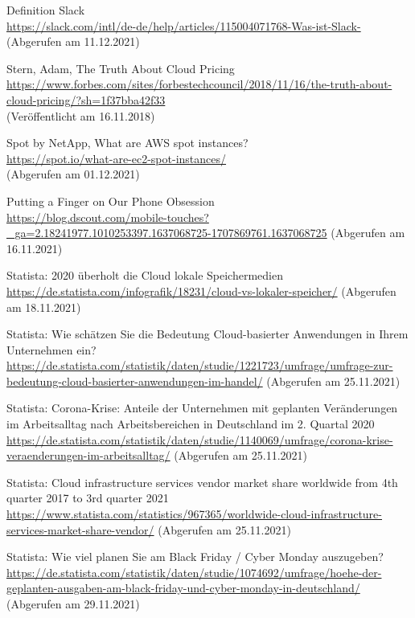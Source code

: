 \begin{thebibliography}{HR08}
  Definition Slack\\
 \url{https://slack.com/intl/de-de/help/articles/115004071768-Was-ist-Slack-}
 (Abgerufen am 11.12.2021)

  Stern, Adam, The Truth About Cloud Pricing \\
  \url{https://www.forbes.com/sites/forbestechcouncil/2018/11/16/the-truth-about-cloud-pricing/?sh=1f37bba42f33}\\
  (Veröffentlicht am 16.11.2018)

 Spot by NetApp, What are AWS spot instances?\\
  \url{https://spot.io/what-are-ec2-spot-instances/}\\
  (Abgerufen am 01.12.2021)
  
    Putting a Finger on Our Phone Obsession\\
 \url{https://blog.dscout.com/mobile-touches?_ga=2.18241977.1010253397.1637068725-1707869761.1637068725}
 (Abgerufen am 16.11.2021)

    Statista: 2020 überholt die Cloud lokale Speichermedien\\
 \url{https://de.statista.com/infografik/18231/cloud-vs-lokaler-speicher/}
 (Abgerufen am 18.11.2021)

    Statista: Wie schätzen Sie die Bedeutung Cloud-basierter Anwendungen in Ihrem Unternehmen ein?\\
 \url{https://de.statista.com/statistik/daten/studie/1221723/umfrage/umfrage-zur-bedeutung-cloud-basierter-anwendungen-im-handel/}
 (Abgerufen am 25.11.2021) 
  
    Statista: Corona-Krise: Anteile der Unternehmen mit geplanten Veränderungen im Arbeitsalltag nach Arbeitsbereichen in Deutschland im 2. Quartal 2020\\
 \url{https://de.statista.com/statistik/daten/studie/1140069/umfrage/corona-krise-veraenderungen-im-arbeitsalltag/}
 (Abgerufen am 25.11.2021) 
   
   Statista: Cloud infrastructure services vendor market share worldwide from 4th quarter 2017 to 3rd quarter 2021\\
 \url{https://www.statista.com/statistics/967365/worldwide-cloud-infrastructure-services-market-share-vendor/}
 (Abgerufen am 25.11.2021) 
  
  Statista: Wie viel planen Sie am Black Friday / Cyber Monday auszugeben? \\
 \url{https://de.statista.com/statistik/daten/studie/1074692/umfrage/hoehe-der-geplanten-ausgaben-am-black-friday-und-cyber-monday-in-deutschland/}
 (Abgerufen am 29.11.2021) 


\end{thebibliography}
